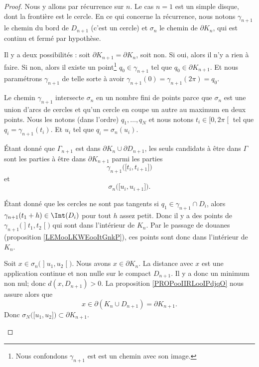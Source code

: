 \begin{proof}
	Nous y allons par récurrence sur \( n\). Le cas \( n=1\) est un simple disque, dont la frontière est le cercle. En ce qui concerne la récurrence, nous notons \( \gamma_{n+1}\) le chemin du bord de \( D_{n+1}\) (c'est un cercle) et \( \sigma_n\) le chemin de \( \partial K_n\), qui est continu et fermé par hypothèse.

	Il y a deux possibilités : soit \( \partial K_{n+1}=\partial K_n\), soit non. Si oui, alors il n'y a rien à faire. Si non, alors il existe un point\footnote{Nous confondons \( \gamma_{n+1}\) est est un chemin avec son image.} \( q_0\in \gamma_{n+1}\) tel que \( q_0\in\partial K_{n+1}\). Et nous paramétrons \( \gamma_{n+1}\) de telle sorte à avoir \( \gamma_{n+1}(0)=\gamma_{n+1}(2\pi)=q_0\).

	\begin{subproof}


		Le chemin \( \gamma_{n+1}\) intersecte \( \sigma_n\) en un nombre fini de points parce que \( \sigma_n\) est une union d'arcs de cercles et qu'un cercle en coupe un autre au maximum en deux points. Nous les notons (dans l'ordre) \( q_1,\ldots,q_N\) et nous notons \( t_i\in\mathopen[ 0,2\pi\mathclose[\) tel que \( q_i=\gamma_{n+1}(t_i)\). Et \( u_i\) tel que \( q_i=\sigma_n(u_i)\).

		Étant donné que \( \Gamma_{n+1}\) est dans \( \partial K_n\cup \partial D_{n+1}\), les seuls candidats à être dans \( \Gamma\) sont les parties à être dans \( \partial K_{n+1}\) parmi les parties
		\begin{equation}
			\gamma_{n+1}\big( \mathopen[ t_i,t_{i+1}\mathclose] \big)
		\end{equation}
		et
		\begin{equation}
			\sigma_n\big( \mathopen[ u_i,u_{i+1}\mathclose] \big).
		\end{equation}

		\spitem[De \( q_1\) à \( q_2\)]
		Étant donné que les cercles ne sont pas tangents si \( q_1\in \gamma_{n+1}\cap D_i\), alors \( \gamma_{n+1}(t_1+h)\in \Int(D_i)\) pour tout \( h\) assez petit. Donc il y a des points de \( \gamma_{n+1}\big( \mathopen] t_1,t_2\mathclose[ \big)\) qui sont dans l'intérieur de \( K_n\). Par le passage de douanes (proposition \ref{LEMooLKWEooItGnkP}), ces points sont donc dans l'intérieur de \(K_n \).

		Soit \( x\in\sigma_n\big( \mathopen] u_1,u_2\mathclose[ \big)\). Nous avons \( x\in\partial K_n\). La distance avec \( x\) est une application continue et non nulle sur le compact \( D_{n+1}\). Il y a donc un minimum non nul; donc \( d(x,D_{n+1})>0\). La proposition \ref{PROPooIIRLooIPdjqO} nous assure alors que
		\begin{equation}
			x\in \partial(K_n\cup D_{n+1})=\partial K_{n+1}.
		\end{equation}
		Donc \( \sigma_N\big( \mathopen[ u_1,u_2\mathclose] \big)\subset \partial K_{n+1}\).


\end{subproof}
\end{proof}

